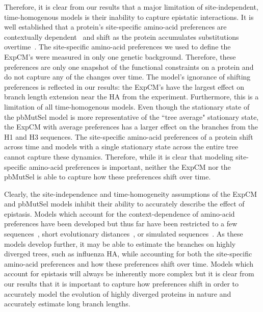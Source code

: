 \documentclass[11pt]{article}
\begin{document}
Therefore, it is clear from our results that a major limitation of site-independent, time-homogenous models is their inability to capture epistatic interactions. 
It is well established that a protein's site-specific amino-acid preferences are contextually dependent~\citep{gong2013stability, harms2014historical, tufts2014epistasis, ortlund2007crystal} and shift as the protein accumulates substitutions overtime~\citep{haddox2018mapping, starr2018pervasive, pollock2012amino, doud2015site, shah2015contingency,bazykin2015changing}. 
The site-specific amino-acid preferences we used to define the ExpCM's were measured in only one genetic background. 
Therefore, these preferences are only one snapshot of the functional constraints on a protein and do not capture any of the changes over time. 
The model's ignorance of shifting preferences is reflected in our results: the ExpCM's have the largest effect on branch length extension near the HA from the experiment. 
Furthermore, this is a limitation of all time-homogenous models. 
Even though the stationary state of the pbMutSel model is more representative of the ``tree average" stationary state, the ExpCM with average preferences has a larger effect on the branches from the H1 and H3 sequences. 
The site-specific amino-acid preferences of a protein shift across time and models with a single stationary state across the entire tree cannot capture these dynamics. 
Therefore, while it is clear that modeling site-specific amino-acid preferences is important, neither the ExpCM nor the pbMutSel is able to capture how these preferences shift over time.

Clearly, the site-independence and time-homogeneity assumptions of the ExpCM and pbMutSel models inhibit their ability to accurately describe the effect of epistasis.
Models which account for the context-dependence of amino-acid preferences have been developed but thus far have been restricted to a few sequences~\citep{rodrigue2005site, choi2007quantifying}, short evolutionary distances~\citep{bordner2013new}, or simulated sequences~\citep{goldstein2017sequence}.
As these models develop further, it may be able to estimate the branches on highly diverged trees, such as influenza HA, while accounting for both the site-specific amino-acid preferences and how these preferences shift over time. 
Models which account for epistasis will always be inherently more complex but it is clear from our results that it is important to capture how preferences shift in order to accurately model the evolution of highly diverged proteins in nature and accurately estimate long branch lengths. 
\end{document}
